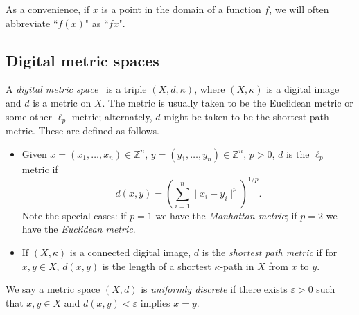 \documentclass{article}
\newtheorem{definition}[thm]{Definition}
\numberwithin{thm}{section}
\def\Z{{\mathbb Z}}
\def\N{{\mathbb N}}
\begin{document}

As a convenience, if $x$ is a point in the domain of a function $f$, we will often
abbreviate ``$f(x)$" as ``$fx$".

\subsection{Digital metric spaces}
\label{DigMetSp}
A {\em digital metric space}~\cite{EgeKaraca-Ban} is a triple
$(X,d,\kappa)$, where $(X,\kappa)$ is a digital image and $d$ is a metric on $X$. The
metric is usually taken to be the Euclidean
metric or some other $\ell_p$ metric; 
alternately, $d$ might be taken to be the
shortest path metric. These are defined
as follows.
\begin{itemize}
    \item Given 
          $x = (x_1, \ldots, x_n) \in \Z^n$,
          $y = (y_1, \ldots, y_n) \in \Z^n$,
          $p > 0$, $d$ is the $\ell_p$ metric
          if \[ d(x,y) =
          \left ( \sum_{i=1}^n
          \mid x_i - y_i \mid ^ p
          \right ) ^ {1/p}. \]
          Note the special cases: if $p=1$ we
          have the {\em Manhattan metric}; if
          $p=2$ we have the 
          {\em Euclidean metric}.
    \item \cite{ChartTian} If $(X,\kappa)$ is a 
          connected digital image, 
          $d$ is the {\em shortest path metric}
          if for $x,y \in X$, $d(x,y)$ is the 
          length of a shortest
          $\kappa$-path in $X$ from $x$ to $y$.
\end{itemize}


We say a metric space $(X,d)$ is {\em uniformly discrete}
if there exists $\varepsilon > 0$ such that
$x,y \in X$ and $d(x,y) < \varepsilon$ implies $x=y$.
\end{document}
